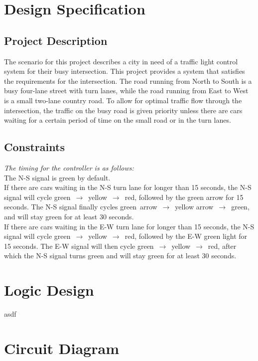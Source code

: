 \section{Design Specification}
\subsection{Project Description}
The scenario for this project describes a city in need of a traffic light control system for their busy intersection.
This project provides a system that satisfies the requirements for the intersection. The road running from North to South is a busy four-lane street with turn lanes,
while the road running from East to West is a small two-lane country road. To allow for optimal traffic flow through the intersection,
the traffic on the busy road is given priority unless there are cars waiting for a certain period of time on the small road or in the turn lanes.

\subsection{Constraints}
\emph{The timing for the controller is as follows:}\\[5mm]
The N-S signal is green by default.\\[5mm]
If there are cars waiting in the N-S turn lane for longer than 15 seconds, the N-S signal will cycle green~$\rightarrow$~yellow~$\rightarrow$~red, followed by the green arrow for 15 seconds.
The N-S signal finally cycles green~arrow~$\rightarrow$~yellow arrow~$\rightarrow$~green, and will stay green for at least 30 seconds.\\[5mm]
If there are cars waiting in the E-W turn lane for longer than 15 seconds, the N-S signal will cycle green~$\rightarrow$~yellow~$\rightarrow$~red, followed by the E-W green light for 15 seconds.
The E-W signal will then cycle green~$\rightarrow$~yellow~$\rightarrow$~red, after which the N-S signal turns green and will stay green for at least 30 seconds.

\section{Logic Design}
asdf

\section{Circuit Diagram}
